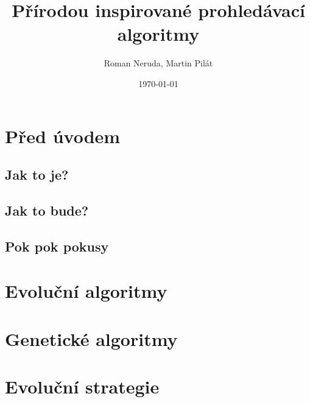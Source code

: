 \documentclass[a4paper,nofonts,justified]{tufte-book}
\title{Přírodou inspirované prohledávací algoritmy}
\author{Roman Neruda, Martin Pilát}
\date{\today}
\begin{document}
\maketitle

\mainmatter

\chapter{Před úvodem}
\section{Jak to je?}

\section{Jak to bude?}
\section{Pok pok pokusy}


\chapter{Evoluční algoritmy}


\chapter{Genetické algoritmy}


\chapter{Evoluční strategie}

\backmatter

\tableofcontents
\listoffigures
\listoftables
\listofalgorithms 

\nocite{*}


\end{document}
